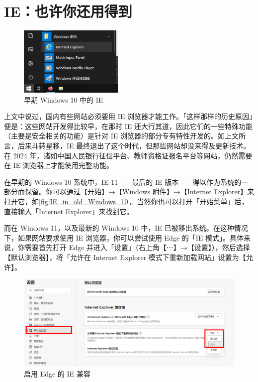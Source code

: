 \section{IE：也许你还用得到}

\begin{figure}
  \centering
  \includegraphics[width=5cm]{assets/software/IE_in_old_Windows_10.png}
  \caption{早期 Windows 10 中的 IE}
  \label{fig:IE_in_old_Windows_10}
\end{figure}

上文中说过，国内有些网站必须要用 IE 浏览器才能工作。「这样那样的历史原因」便是：这些网站开发得比较早，在那时 IE 还大行其道，因此它们的一些特殊功能（主要是安全相关的功能）是针对 IE 浏览器的部分专有特性开发的。如上文所言，后来斗转星移，IE 最终退出了这个时代，但那些网站却没来得及更新技术。在 2024 年，诸如中国人民银行征信平台、教师资格证报名平台等网站，仍然需要在 IE 浏览器上才能使用完整功能。

在早期的 Windows 10 系统中，IE 11——最后的 IE 版本——得以作为系统的一部分而保留。你可以通过【开始】→【Windows 附件】→【Internet Explorer】来打开它，如\autoref{fig:IE_in_old_Windows_10}。当然你也可以打开「开始菜单」后，直接输入「Internet Explorer」来找到它。

而在 Windows 11，以及最新的 Windows 10 中，IE 已被移出系统。在这种情况下，如果网站要求使用 IE 浏览器，你可以尝试使用 Edge 的「IE 模式」。具体来说，你需要首先打开 Edge 并进入「设置」（右上角【⋯】→【设置】），然后选择【默认浏览器】，将「允许在 Internet Explorer 模式下重新加载网站」设置为【允许】。

\begin{figure}[htb!]
  \centering
  \includegraphics[width=.85\textwidth]{assets/software/Edge_IE_Mode_1.png}
  \caption{启用 Edge 的 IE 兼容}
  \label{fig:Edge_IE_Mode_1}
\end{figure}

